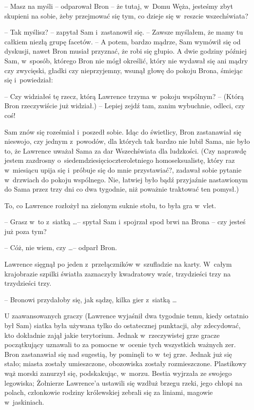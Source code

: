 \documentclass[oneside,polish,11pt,rmheadings]{mwbk}
\begin{document}
-- Masz na myśli -- odparował Bron -- że tutaj, w~Domu Węża, jesteśmy zbyt skupieni na sobie, żeby przejmować się tym, co dzieje się w~reszcie wszechświata?  

-- Tak myślisz? -- zapytał Sam i~zastanowił się. -- Zawsze myślałem, że mamy tu całkiem niezłą grupę facetów. -- A potem, bardzo mądrze, Sam wymówił się od dyskusji, nawet Bron musiał przyznać, że robi się głupio. A dwie godziny później Sam, w~sposób, którego Bron nie mógł określić, który nie wydawał się ani mądry czy zwycięski, gładki czy nieprzyjemny, wsunął głowę do pokoju Brona, śmiejąc się i~powiedział:  

-- Czy widziałeś tę rzecz, którą Lawrence trzyma w~pokoju wspólnym? -- (Którą Bron rzeczywiście już widział.) -- Lepiej zejdź tam, zanim wybuchnie, odleci, czy coś! 

Sam znów się roześmiał i~poszedł sobie.  Idąc do świetlicy, Bron zastanawiał się nieswojo, czy jednym z~powodów, dla których tak bardzo nie lubił Sama, nie było to, że Lawrence uważał Sama za dar Wszechświata dla ludzkości. (Czy naprawdę jestem zazdrosny o~siedemdziesięcioczteroletniego homoseksualistę, który raz w~miesiącu upija się i~próbuje się do mnie przystawiać?,  zadawał sobie pytanie w~drzwiach do pokoju wspólnego. Nie, łatwiej było bądź przyjaźnie nastawionym do Sama przez trzy dni co dwa tygodnie, niż poważnie traktować ten pomysł.) 

To, co Lawrence rozłożył na zielonym suknie stołu, to była gra w~vlet. 

-- Grasz w~to z~siatką \ldots -- spytał Sam i~spojrzał spod brwi na Brona -- czy jesteś już poza tym? 

-- Cóż, nie wiem, czy \ldots  -- odparł Bron. 

Lawrence sięgnął po jeden z~przełączników w~szufladzie na karty. W~całym krajobrazie szpilki światła zaznaczyły kwadratowy wzór, trzydzieści trzy na trzydzieści trzy. 

-- Bronowi przydałoby się, jak sądzę, kilka gier z~siatką \ldots  

U zaawansowanych graczy (Lawrence wyjaśnił dwa tygodnie temu, kiedy ostatnio był Sam) siatka była używana tylko do ostatecznej punktacji, aby zdecydować, kto dokładnie zajął jakie terytorium. Jednak w~rzeczywistej grze gracze początkujący uznawali to za pomocne w~ocenie tych wszystkich ważnych zer. Bron zastanawiał się nad sugestią, by pominęli to w~tej grze. Jednak już się stało; miasta zostały umieszczone, obozowiska zostały rozmieszczone. Plastikowy wąż morski zanurzył się, podskakując, w~morzu. Bestia wyjrzała ze swojego legowiska; Żołnierze Lawrence'a ustawili się wzdłuż brzegu rzeki, jego chłopi na polach, członkowie rodziny królewskiej zebrali się za liniami, magowie w~jaskiniach. 
\end{document}
